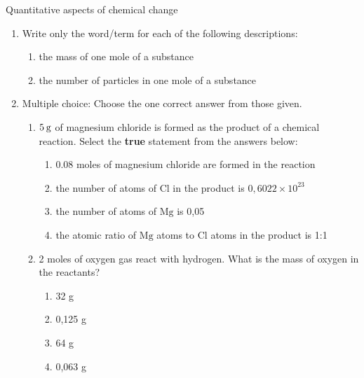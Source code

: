             \begin{eocexercises}{Quantitative aspects of chemical change}
            \nopagebreak \noindent
      \label{m38712*id286171}\begin{enumerate}[noitemsep, label=\textbf{\arabic*}. ] 
            \label{m38712*uid123}\item Write only the word/term for each of the following descriptions:
\label{m38712*id286187}\begin{enumerate}[noitemsep, label=\textbf{\alph*}. ] 
            \label{m38712*uid124}\item the mass of one mole of a substance
\label{m38712*uid125}\item the number of particles in one mole of a substance
\end{enumerate}
                \label{m38712*uid126}\item Multiple choice: Choose the one correct answer from those given.
\label{m38712*id286228}\begin{enumerate}[noitemsep, label=\textbf{\alph*}. ] 
            \label{m38712*uid127}\item $5\phantom{\rule{2pt}{0ex}}\text{g}$ of magnesium chloride is formed as the product of a chemical reaction. Select the \textbf{true} statement from the answers below:
\label{m38712*id286251}\begin{enumerate}[noitemsep, label=\textbf{\alph*}. ] 
            \label{m38712*uid128}\item 0.08 moles of magnesium chloride are formed in the reaction
\label{m38712*uid129}\item the number of atoms of $\text{Cl}$ in the product is $0,6022\ensuremath{\times}{10}^{23}$\label{m38712*uid130}\item the number of atoms of $\text{Mg}$ is 0,05
\label{m38712*uid131}\item the atomic ratio of $\text{Mg}$ atoms to $\text{Cl}$ atoms in the product is 1:1
\end{enumerate}
                \label{m38712*uid132}\item 2 moles of oxygen gas react with hydrogen. What is the mass of oxygen in the reactants?
\label{m38712*id286339}\begin{enumerate}[noitemsep, label=\textbf{\alph*}. ] 
            \label{m38712*uid133}\item 32 g
\label{m38712*uid134}\item 0,125 g
\label{m38712*uid135}\item 64 g
\label{m38712*uid136}\item 0,063 g

\end{enumerate}
\end{enumerate}
\end{enumerate}
\end{eocexercises}
